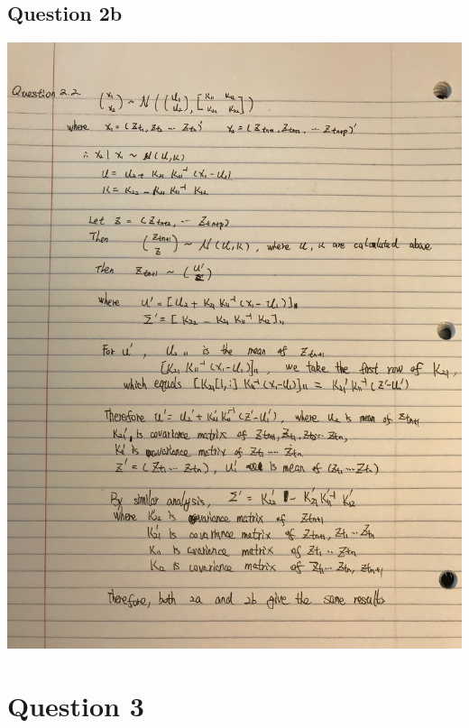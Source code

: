 \documentclass[11pt]{article} %
\begin{document}
\subsection{Question 2b}
\includegraphics[scale = 0.15]{e22.jpeg}\\
\section{Question 3}
\end{document}
